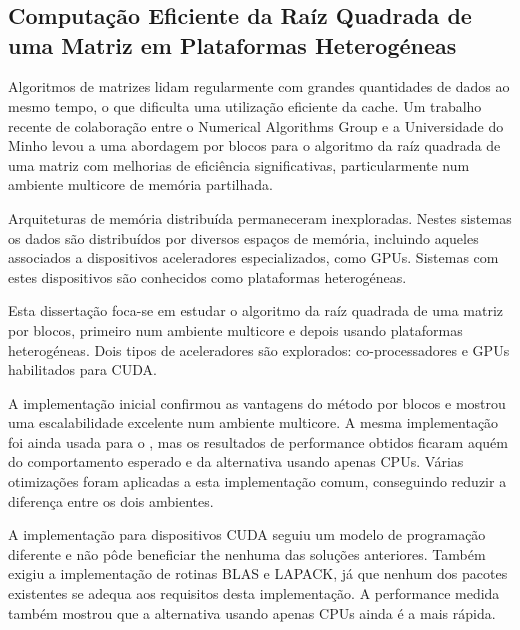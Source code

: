 \documentclass[../thesis]{subfiles}
\begin{document}
	\chapter*{\abstractname}
		\section*{Computação Eficiente da Raíz Quadrada de uma Matriz em Plataformas Heterogéneas}

		Algoritmos de matrizes lidam regularmente com grandes quantidades de dados ao mesmo tempo, o que dificulta uma utilização eficiente da cache. Um trabalho recente de colaboração entre o Numerical Algorithms Group e a Universidade do Minho levou a uma abordagem por blocos para o algoritmo da raíz quadrada de uma matriz com melhorias de eficiência significativas, particularmente num ambiente multicore de memória partilhada.

		Arquiteturas de memória distribuída permaneceram inexploradas. Nestes sistemas os dados são distribuídos por diversos espaços de memória, incluindo aqueles associados a dispositivos aceleradores especializados, como GPUs. Sistemas com estes dispositivos são conhecidos como plataformas heterogéneas.

		Esta dissertação foca-se em estudar o algoritmo da raíz quadrada de uma matriz por blocos, primeiro num ambiente multicore e depois usando plataformas heterogéneas. Dois tipos de aceleradores são explorados: co-processadores \intel\xeonphi e GPUs \nvidia habilitados para CUDA.

		A implementação inicial confirmou as vantagens do método por blocos e mostrou uma escalabilidade excelente num ambiente multicore. A mesma implementação foi ainda usada para o \intel\xeonphi, mas os resultados de performance obtidos ficaram aquém do comportamento esperado e da alternativa usando apenas CPUs. Várias otimizações foram aplicadas a esta implementação comum, conseguindo reduzir a diferença entre os dois ambientes.

		A implementação para dispositivos CUDA seguiu um modelo de programação diferente e não pôde beneficiar the nenhuma das soluções anteriores. Também exigiu a implementação de rotinas BLAS e LAPACK, já que nenhum dos pacotes existentes se adequa aos requisitos desta implementação. A performance medida também mostrou que a alternativa usando apenas CPUs ainda é a mais rápida.
\end{document}
